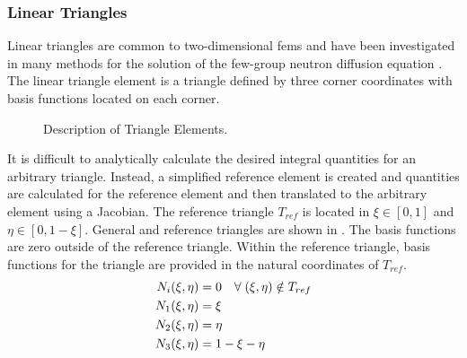     \subsubsection{Linear Triangles}
      Linear triangles are common to two-dimensional \glspl{fem} and have been
      investigated in many methods for the solution of the few-group neutron
      diffusion equation \cite{Hosseini2017,Hosseini2013,Hosseini2015}.
      The linear triangle element is a triangle defined by three corner
      coordinates with basis functions located on each corner. 

      \begin{figure}
        \centering
        \hspace{0.25in}
        \caption{Description of Triangle Elements.}
        \label{fig:triangle_elements}
      \end{figure}

      It is difficult to analytically calculate the desired integral quantities
      for an arbitrary triangle. Instead, a simplified reference element is
      created and quantities are calculated for the reference element and then
      translated to the arbitrary element using a Jacobian.  The reference
      triangle $T_{ref}$ is located in $\xi \in [0,1]$ and $\eta \in [0,1-\xi]$.
      General and reference triangles are shown in .
      The basis functions are zero outside of the reference triangle. Within
      the reference triangle, basis functions for the triangle are provided in 
      the natural coordinates of $T_{ref}$.
      \begin{align}
        N_i(\xi,\eta) &= 0 \quad \forall \; (\xi,\eta) \notin T_{ref} \\
        N_1(\xi,\eta) &= \xi \\
        N_2(\xi,\eta) &= \eta \\
        N_3(\xi,\eta) &= 1-\xi-\eta
      \end{align}
      
